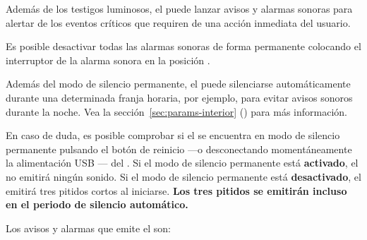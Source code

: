 Además de los testigos luminosos, el \CMS puede lanzar avisos y alarmas sonoras para alertar de los eventos críticos que requiren de una acción in\-me\-diata del usuario.

Es posible desactivar todas las alarmas sonoras de forma permanente colocando el interruptor de la alarma sonora  en la posición \off.
\tipend

Además del modo de silencio permanente, el \CMS puede silenciarse automáticamente durante una determinada franja horaria, por ejemplo, para evitar avisos sonoros durante la noche. Vea la sección~\ref{sec:params-interior} (\textit{}) para más información.
\tipend

En caso de duda, es posible comprobar si el \CMS se encuentra en modo de silencio permanente pulsando el botón de reinicio  ---o desconectando momentáneamente la alimentación USB --- del \MIE. Si el modo de silencio permanente está \textbf{activado}, el \CMS no emitirá ningún sonido. Si el modo de silencio permanente está \textbf{desactivado}, el \CMS emitirá tres pitidos cortos al iniciarse. \textbf{Los tres pitidos se emitirán incluso en el periodo de silencio automático.}
\tipend


Los avisos y alarmas que emite el \CMS son:

